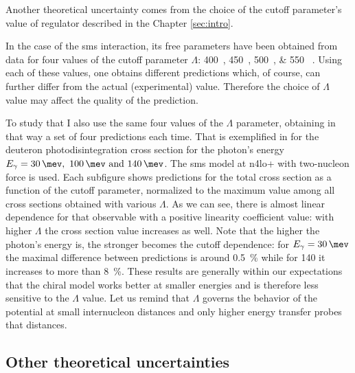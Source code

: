     Another theoretical uncertainty comes from the choice of the cutoff parameter's value 
    of regulator described in the Chapter \ref{sec:intro}.

    In the case of the \gls{sms} interaction, its free parameters have been obtained from data for 
   four values of the cutoff parameter $\Lambda$:
   \SIlist[list-units = single]{400;450;500;550}{\mev} \cite{reinkrebs2018}.
   Using each of these values, one obtains different predictions which, of course, can further differ 
   from the actual (experimental) value. Therefore the choice of $\Lambda$ value
   may affect the quality of the prediction.

    To study that I also use the same four values of the $\Lambda$ parameter,
    obtaining in that way a set of four predictions each time.
    That is exemplified in   for the deuteron photodisintegration cross section for the
    photon's energy $E_\gamma = \SIlist{30;100;140}{\mev}$.
    The \gls{sms} model at \gls{n4lo+} with two-nucleon force is used.
    Each subfigure shows predictions for the total cross section as 
    a function of the cutoff parameter,
    normalized to the maximum value among all cross sections
    obtained with various $\Lambda$.
    As we can see, there is almost linear dependence for that observable with a positive linearity coefficient value:
    with higher $\Lambda$ the cross section value increases as well.
    Note that the higher the photon's energy is, the stronger becomes the cutoff dependence: for $E_\gamma=\SI{30}{\mev}$
    the maximal difference between predictions is around \SI{0.5}{\percent} while
    for \SI{140}{\mev} it increases to more than \SI{8}{\percent}.
    These results are generally within our expectations that the chiral model works better at
    smaller energies
    and is therefore less sensitive to the $\Lambda$ value. Let us remind that $\Lambda$ 
    governs the behavior of the potential at small internucleon distances and only higher energy transfer probes that distances. 



    \subsection*{Other theoretical uncertainties}

